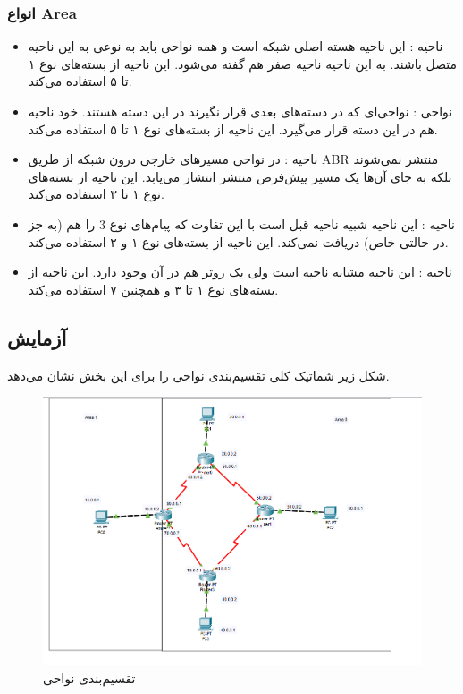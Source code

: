 \documentclass[12pt]{article}
\begin{document}
\subsubsection{انواع Area}
\begin{itemize}
	\item ناحیه : این ناحیه هسته اصلی شبکه  است و همه نواحی باید به نوعی به این ناحیه متصل باشند. به این ناحیه ناحیه صفر هم گفته می‌شود. این ناحیه از بسته‌های نوع ۱ تا ۵ استفاده می‌کند.
	
	\item نواحی :
	نواحی‌ای که در دسته‌های بعدی قرار نگیرند در این دسته هستند. خود ناحیه  هم در این دسته قرار می‌گیرد. این ناحیه از بسته‌های نوع ۱ تا ۵ استفاده می‌کند.
	
	\item ناحیه :
	در نواحی  مسیر‌های خارجی درون شبکه از طریق ABR منتشر نمی‌شوند بلکه به جای آن‌ها یک مسیر پیش‌فرض منتشر انتشار می‌یابد. این ناحیه از بسته‌های نوع ۱ تا ۳ استفاده می‌کند.
	
	\item ناحیه :
	این ناحیه شبیه ناحیه قبل است با این تفاوت که پیام‌های نوع 3 را هم (به جز در حالتی خاص) دریافت نمی‌کند. این ناحیه از بسته‌های نوع ۱ و ۲ استفاده می‌کند.
	
	\item ناحیه :
	این ناحیه مشابه ناحیه  است ولی یک روتر  هم در آن وجود دارد. این ناحیه از بسته‌های نوع ۱ تا ۳ و همچنین ۷ استفاده می‌کند.
\end{itemize}

\subsection{آزمایش}

شکل زیر شماتیک کلی تقسیم‌بندی نواحی را برای این بخش نشان می‌دهد.

\begin{figure}[H]
	\centering
	\includegraphics[scale=0.4]{images/ospf/topo.png}
	\caption{تقسیم‌بندی نواحی } 
	\label{ospftopo}
\end{figure}
\end{document}

